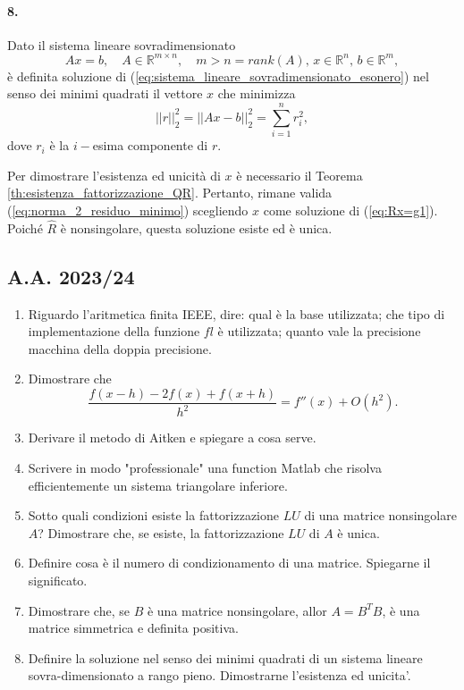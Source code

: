 \paragraph{8.} Dato il sistema lineare sovradimensionato
\begin{equation}\label{eq:sistema_lineare_sovradimensionato_esonero}
    Ax=b,\quad A\in\mathbb R^{m\times n},\quad m>n=rank(A),\, x\in\mathbb R^n,\, b\in\mathbb R^m,
\end{equation}
è definita soluzione di (\ref{eq:sistema_lineare_sovradimensionato_esonero}) nel senso dei minimi quadrati il vettore $x$ che minimizza
\begin{equation*}
    ||r||_2^2=||Ax-b||_2^2=\sum_{i=1}^nr_i^2,
\end{equation*}
dove $r_i$ è la $i-$esima componente di $r$.

\noindent Per dimostrare l'esistenza ed unicità di $x$ è necessario il Teorema \ref{th:esistenza_fattorizzazione_QR}. Pertanto, rimane valida (\ref{eq:norma_2_residuo_minimo}) scegliendo $x$ come soluzione di (\ref{eq:Rx=g1}). Poiché $\widehat R$ è nonsingolare, questa soluzione esiste ed è unica.

\subsection{A.A. 2023/24}
\begin{enumerate}
	\item Riguardo l'aritmetica finita IEEE, dire: qual è la base utilizzata; che tipo di implementazione della funzione $fl$ è utilizzata; quanto vale la precisione macchina della doppia precisione.
	\item Dimostrare che
	\begin{equation*}
		\frac{f(x-h)-2f(x)+f(x+h)}{h^2} = f''(x) + O(h^2).
	\end{equation*}
	\item Derivare il metodo di Aitken e spiegare a cosa serve.
	\item Scrivere in modo "professionale" una function Matlab che risolva efficientemente un sistema triangolare inferiore.
	\item Sotto quali condizioni esiste la fattorizzazione $LU$ di una matrice nonsingolare $A$? Dimostrare che, se esiste, la fattorizzazione $LU$ di $A$ è unica.
	\item Definire cosa è il numero di condizionamento di una matrice. Spiegarne il significato.
	\item Dimostrare che, se $B$ è una matrice nonsingolare, allor $A=B^TB$, è una matrice simmetrica e definita positiva.
	\item Definire la soluzione nel senso dei minimi quadrati di un sistema lineare sovra-dimensionato a rango pieno. Dimostrarne l'esistenza ed unicita'.
\end{enumerate}

